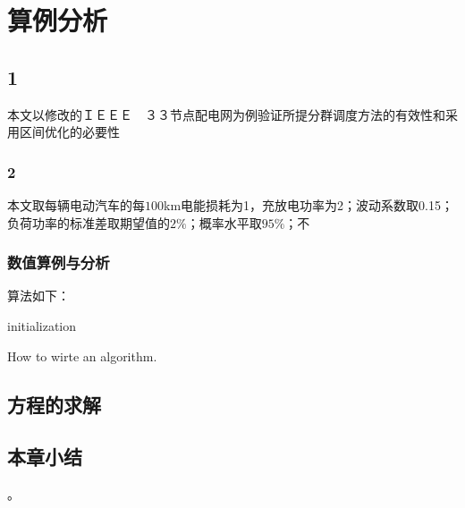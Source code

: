 
\chapter{算例分析}
\section{1}
本文以修改的ＩＥＥＥ　３３节点配电网为例验证所提分群调度方法的有效性和采用区间优化的必要性
\subsection{2}
本文取每辆电动汽车的每$100$km电能损耗为1，充放电功率为2；波动系数取0.15；负荷功率的标准差取期望值的$2\%$；概率水平取$95\%$；不

\subsection{数值算例与分析}
算法如下：

\begin{algorithm}[H]
 initialization\;
 \caption{How to wirte an algorithm.}
\end{algorithm}


\section{方程的求解}

\section{本章小结}
。